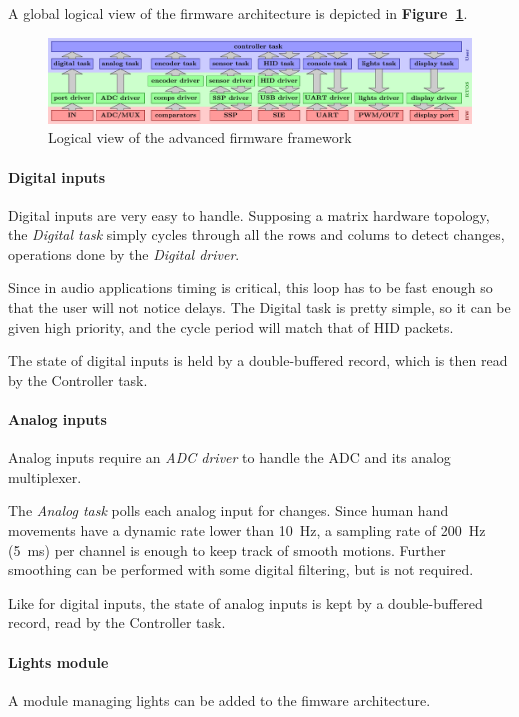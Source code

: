 \documentclass[a4paper,10pt]{article}
\newcommand{\citef}[1]{\textbf{Figure~\ref{#1}}}
\begin{document}
\begin{multicols}{2}
A global logical view of the firmware architecture is depicted in
\citef{fig:fw_adv}.

\begin{figure}[t]
	\centering
	\includegraphics[keepaspectratio=true,scale=0.4]{images/fw_adv.pdf}
	\caption{Logical view of the advanced firmware framework}
	\label{fig:fw_adv}
\end{figure}


\paragraph{Digital inputs}
Digital inputs are very easy to handle. Supposing a matrix hardware topology,
the \emph{Digital task} simply cycles through all the rows and colums to
detect changes, operations done by the \emph{Digital driver}.

Since in audio applications timing is critical, this loop has to be fast
enough so that the user will not notice delays. The Digital task is pretty
simple, so it can be given high priority, and the cycle period will match
that of HID packets.

The state of digital inputs is held by a double-buffered record, which is then
read by the Controller task.


\paragraph{Analog inputs}
Analog inputs require an \emph{ADC driver} to handle the ADC and its analog
multiplexer.

The \emph{Analog task} polls each analog input for changes. Since human hand
movements have a dynamic rate lower than 10~Hz, a sampling rate of 200~Hz
(5~ms) per channel is enough to keep track of smooth motions. Further
smoothing can be performed with some digital filtering, but is not required.

Like for digital inputs, the state of analog inputs is kept by a
double-buffered record, read by the Controller task.


\paragraph{Lights module}
A module managing lights can be added to the fimware architecture.


\end{multicols}
\end{document}
